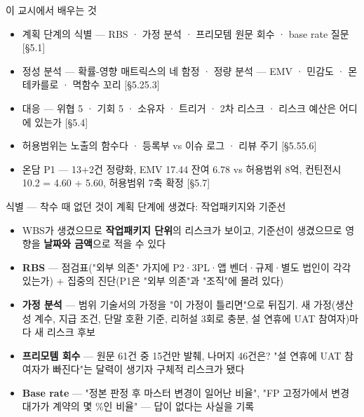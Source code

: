 \begin{frame}{이 교시에서 배우는 것}
\begin{itemize}
\item 계획 단계의 식별 — RBS · 가정 분석 · 프리모템 원문 회수 · base rate 질문 [§5.1]
\item 정성 분석 — 확률-영향 매트릭스의 네 함정 · 정량 분석 — EMV · 민감도 · 몬테카를로 · 멱함수 꼬리 [§5.2\til{}5.3]
\item 대응 — 위협 5 · 기회 5 · 소유자 · 트리거 · 2차 리스크 · 리스크 예산은 어디에 있는가 [§5.4]
\item 허용범위는 노출의 함수다 · 등록부 vs 이슈 로그 · 리뷰 주기 [§5.5\til{}5.6]
\item 온담 P1 — 13+2건 정량화, EMV 17.44 \ra{} 잔여 6.78 vs 허용범위 8억, 컨틴전시 10.2 = 4.60 + 5.60, 허용범위 7축 확정 [§5.7]
\end{itemize}
\end{frame}

\begin{frame}{식별 — 착수 때 없던 것이 계획 단계에 생겼다: 작업패키지와 기준선}
\begin{itemize}
\item WBS가 생겼으므로 \textbf{작업패키지 단위}의 리스크가 보이고, 기준선이 생겼으므로 영향을 \textbf{날짜와 금액}으로 적을 수 있다
\item \textbf{RBS} — 점검표("외부 의존" 가지에 P2·3PL·앱 벤더·규제·별도 법인이 각각 있는가) + 집중의 진단(P1은 "외부 의존"과 "조직"에 몰려 있다)
\item \textbf{가정 분석} — 범위 기술서의 가정을 "이 가정이 틀리면"으로 뒤집기. 새 가정(생산성 계수, 지급 조건, 단말 호환 기준, 리허설 3회로 충분, 설 연휴에 UAT 참여자)마다 새 리스크 후보
\item \textbf{프리모템 회수} — 원문 61건 중 15건만 발췌, 나머지 46건은? "설 연휴에 UAT 참여자가 빠진다"는 달력이 생기자 구체적 리스크가 됐다
\item \textbf{Base rate} — "정본 판정 후 마스터 변경이 일어난 비율", "FP 고정가에서 변경 대가가 계약의 몇 \%인 비율" — 답이 없다는 사실을 기록
\end{itemize}
\end{frame}

